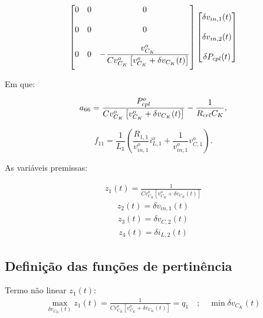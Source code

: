 \begin{gather}
\begin{bmatrix}
      0 & 0                   & 0
                            \\[12pt]
      0 & 0                   & 0
                            \\[12pt]
      0 & 0                   & - \displaystyle \frac{v_{C_K}^o}{Cv_{C_K}^o \left[ v_{C_K}^o + \delta v_{C_K}(t) \right]}
                            \\[12pt]
  \end{bmatrix}
  \begin{bmatrix}
    \delta v_{in,1}(t) \\[12pt] \delta v_{in,2}(t) \\[12pt] \delta P_{cpl}(t)
  \end{bmatrix}
\end{gather}

Em que:

\begin{equation*}
    a_{66} = \displaystyle \frac{P_{cpl}^o}{Cv_{C_K}^o \left[ v_{C_K}^o + \delta v_{C_K}(t) \right]} - \frac{1}{R_{crl} C_K},
\end{equation*} 

\begin{equation*}
    f_{11} = \frac{1}{L_1} \left( \frac{R_{1,1}}{v_{in,1}^o}i_{L,1}^o + \frac{1}{v_{in,1}^o}v_{C,1}^o \right).
\end{equation*}


As variáveis premissas:

\begin{gather*}
    z_1(t) = \frac{1}{Cv_{C_K}^o \left[ v_{C_K}^o + \delta v_{C_K}(t) \right]}
\end{gather*}
\begin{gather*}
    z_2(t) = \delta v_{in,1}(t)
\end{gather*}
\begin{gather*}
    z_3(t) = \delta v_{C,2}(t)
\end{gather*}
\begin{gather}
    z_4(t) = \delta i_{L,2}(t)
\end{gather}

\subsection*{Definição das funções de pertinência}

Termo não linear $z_1(t)$:
\begin{gather*}
    \max_{\delta v_{C_K}(t)} z_1(t) = \frac{1}{Cv_{C_K}^o \left[ v_{C_K}^o + \delta v_{C_K}(t) \right]} = q_1 \quad ; \quad \min \delta v_{C_K}(t)
\end{gather*}

